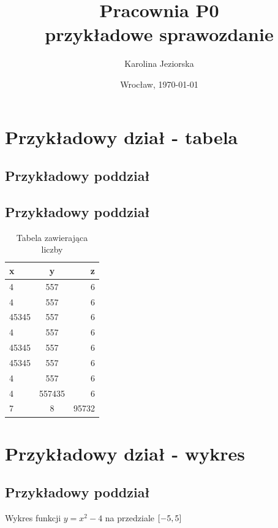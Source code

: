 \documentclass[11pt]{article}
\date{Wrocław, \today}
\title{\LARGE\textbf{Pracownia P0}\\przykładowe sprawozdanie}
\author{Karolina Jeziorska}
\begin{document}
\maketitle

\newtheorem{tw}{Twierdzenie}


\thispagestyle{empty}     
\tableofcontents   

\vspace{1.5cm}\section{Przykładowy dział - tabela}
\subsection{Przykładowy poddział}
\subsection{Przykładowy poddział}

\begin{table}[!htb]
	\centering
	\begin{tabular}{|l|c|r|}\hline
	x & y & z \\ \hline
	4 & 557 & 6 \\ 
	4 & 557 & 6 \\ 
	45345 & 557 & 6 \\ 
	4 & 557 & 6 \\  
	45345 & 557 & 6 \\ 
	45345 & 557 & 6 \\ 
	4 & 557 & 6 \\  
	4 & 557435 & 6 \\ 
	7 & 8 & 95732 \\ \hline	
	\end{tabular}
	\caption{\label{tab:table-name}Tabela zawierająca liczby}
\end{table}


\section{Przykładowy dział - wykres}
\subsection{Przykładowy poddział}

Wykres funkcji \(y = x^2 - 4\) na przedziale \(\interval{-5}{5}\)
\end{document}
